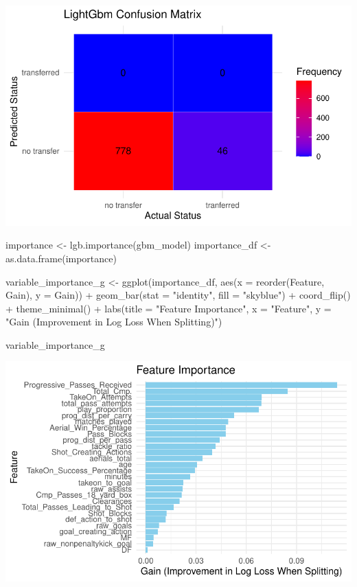 \documentclass[
  letterpaper,
  DIV=11,
  numbers=noendperiod]{scrartcl}
\newenvironment{Shaded}{\begin{snugshade}}{\end{snugshade}}
\newcommand{\AttributeTok}[1]{\textcolor[rgb]{0.40,0.45,0.13}{#1}}
\newcommand{\FunctionTok}[1]{\textcolor[rgb]{0.28,0.35,0.67}{#1}}
\newcommand{\NormalTok}[1]{\textcolor[rgb]{0.00,0.23,0.31}{#1}}
\newcommand{\OtherTok}[1]{\textcolor[rgb]{0.00,0.23,0.31}{#1}}
\newcommand{\SpecialCharTok}[1]{\textcolor[rgb]{0.37,0.37,0.37}{#1}}
\newcommand{\StringTok}[1]{\textcolor[rgb]{0.13,0.47,0.30}{#1}}
\begin{document}
\includegraphics{aaron_lightGBM_modeling_files/figure-pdf/unnamed-chunk-12-1.pdf}

\begin{Shaded}
\begin{Highlighting}[]
\NormalTok{importance }\OtherTok{\textless{}{-}} \FunctionTok{lgb.importance}\NormalTok{(gbm\_model)}
\NormalTok{importance\_df }\OtherTok{\textless{}{-}} \FunctionTok{as.data.frame}\NormalTok{(importance)}

\NormalTok{variable\_importance\_g }\OtherTok{\textless{}{-}} \FunctionTok{ggplot}\NormalTok{(importance\_df, }\FunctionTok{aes}\NormalTok{(}\AttributeTok{x =} \FunctionTok{reorder}\NormalTok{(Feature, Gain),}
                                                   \AttributeTok{y =}\NormalTok{ Gain)) }\SpecialCharTok{+}
  \FunctionTok{geom\_bar}\NormalTok{(}\AttributeTok{stat =} \StringTok{"identity"}\NormalTok{, }\AttributeTok{fill =} \StringTok{"skyblue"}\NormalTok{) }\SpecialCharTok{+}
  \FunctionTok{coord\_flip}\NormalTok{() }\SpecialCharTok{+}
  \FunctionTok{theme\_minimal}\NormalTok{() }\SpecialCharTok{+}
  \FunctionTok{labs}\NormalTok{(}\AttributeTok{title =} \StringTok{"Feature Importance"}\NormalTok{, }\AttributeTok{x =} \StringTok{"Feature"}\NormalTok{,}
       \AttributeTok{y =} \StringTok{"Gain (Improvement in Log Loss When Splitting)"}\NormalTok{)}

\NormalTok{variable\_importance\_g}
\end{Highlighting}
\end{Shaded}

\includegraphics{aaron_lightGBM_modeling_files/figure-pdf/unnamed-chunk-13-1.pdf}
\end{document}

